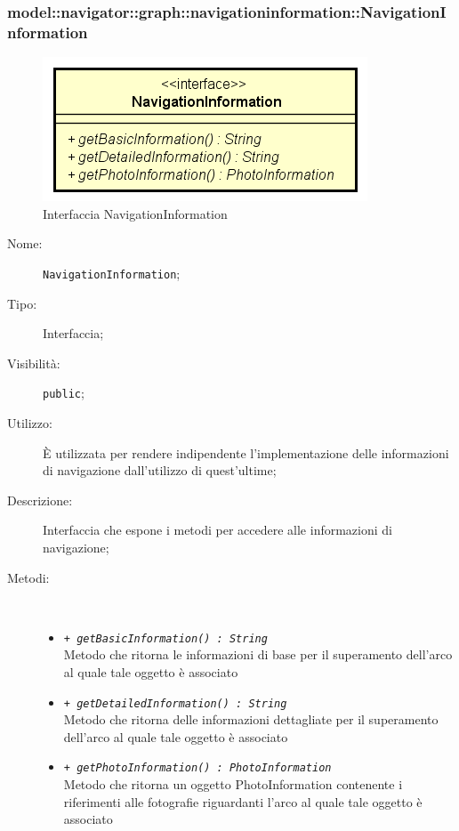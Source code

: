\documentclass[../DefinizioneDiProdotto.tex]{subfiles}
\begin{document}
\subsubsection{model::navigator::graph::navigationinformation::NavigationInformation}

    \begin{figure}[H]
        \centering
        \includegraphics{img/NavigationInformation.png}
        \caption{Interfaccia NavigationInformation}\label{fig:model::navigator::graph::navigationinformation::NavigationInformation} 
    \end{figure}
    \begin{description}
\item[Nome:] \texttt{NavigationInformation};
\item[Tipo:] Interfaccia;
\item[Visibilità:] \texttt{public};
\item[Utilizzo:] È utilizzata per rendere indipendente l'implementazione delle informazioni di navigazione dall'utilizzo di quest'ultime;
\item[Descrizione:] Interfaccia che espone i metodi per accedere alle informazioni di navigazione;
\item[Metodi:] \
\begin{itemize}
\item \texttt{+ \textit{getBasicInformation() : String}}\\
Metodo che ritorna le informazioni di base per il superamento dell'arco al quale tale oggetto è associato
 \item \texttt{+ \textit{getDetailedInformation() : String}}\\
Metodo che ritorna delle informazioni dettagliate per il superamento dell'arco al quale tale oggetto è associato
 \item \texttt{+ \textit{getPhotoInformation() : PhotoInformation}}\\
Metodo che ritorna un oggetto PhotoInformation contenente i riferimenti alle fotografie riguardanti l'arco al quale tale oggetto è associato
 \end{itemize}
\end{description}
\end{document}
